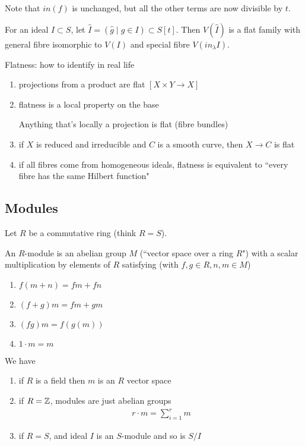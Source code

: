 Note that $in(f)$ is unchanged, but all the other terms are now divisible by $t$.

For an ideal $I \subset S$, let $\hat{I} = (\hat{g} \mid g \in I) \subset S[t]$. Then $V(\hat{I}) $ is a flat family with general fibre isomorphic to $V(I)$ and special fibre $V(in_\lambda I)$.

Flatness: how to identify in real life
\begin{enumerate}
    \item projections from a product are flat $[X \times Y \to X]$
    \item flatness is a local property on the base
    \begin{corollary}
    Anything that's locally a projection is flat (fibre bundles)
    \end{corollary}
    \item if $X$ is reduced and irreducible and $C$ is a smooth curve, then $X \to C$ is flat
    \item if all fibres come from homogeneous ideals, flatness is equivalent to ``every fibre has the same Hilbert function"
\end{enumerate}

\subsection{Modules}

Let $R$ be a commutative ring (think $R = S$).

\begin{definition}
An $R$-module is an abelian group $M$ (``vector space over a ring $R$") with a scalar multiplication by elements of $R$ satisfying (with $f,g \in R, n,m \in M$)
\begin{enumerate}
    \item $f(m+n) = fm+fn$
    \item $(f+g) m = fm+gm$
    \item $(fg)m = f(g(m))$
    \item $1 \cdot m = m$
\end{enumerate}
\end{definition}

\begin{example}
We have
\begin{enumerate}
    \item if $R$ is a field then $m$ is an $R$ vector space
    \item if $R = \mathbb{Z}$, modules are just abelian groups
    \begin{align*}
        r \cdot m = \sum_{i=1}^r m
    \end{align*}
    \item if $R = S$, and ideal $I$ is an $S$-module and so is $S/I$
\end{enumerate}
\end{example}

